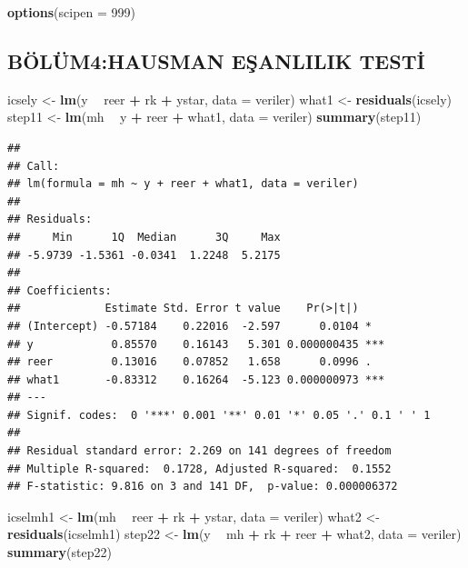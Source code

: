 \documentclass[]{article}
\newenvironment{Shaded}{\begin{snugshade}}{\end{snugshade}}
\newcommand{\KeywordTok}[1]{\textcolor[rgb]{0.13,0.29,0.53}{\textbf{#1}}}
\newcommand{\DataTypeTok}[1]{\textcolor[rgb]{0.13,0.29,0.53}{#1}}
\newcommand{\DecValTok}[1]{\textcolor[rgb]{0.00,0.00,0.81}{#1}}
\newcommand{\StringTok}[1]{\textcolor[rgb]{0.31,0.60,0.02}{#1}}
\newcommand{\OperatorTok}[1]{\textcolor[rgb]{0.81,0.36,0.00}{\textbf{#1}}}
\newcommand{\NormalTok}[1]{#1}
\begin{document}
\begin{Shaded}
\begin{Highlighting}[]
\KeywordTok{options}\NormalTok{(}\DataTypeTok{scipen =} \DecValTok{999}\NormalTok{)}
\end{Highlighting}
\end{Shaded}

\subsection{BÖLÜM4:HAUSMAN EŞANLILIK
TESTİ}\label{bolum4hausman-esanlilik-testi}

\begin{Shaded}
\begin{Highlighting}[]
\NormalTok{icsely <-}\StringTok{ }\KeywordTok{lm}\NormalTok{(y }\OperatorTok{~}\StringTok{ }\NormalTok{reer }\OperatorTok{+}\StringTok{ }\NormalTok{rk }\OperatorTok{+}\StringTok{ }\NormalTok{ystar, }\DataTypeTok{data =}\NormalTok{ veriler)}
\NormalTok{what1 <-}\StringTok{ }\KeywordTok{residuals}\NormalTok{(icsely)}
\NormalTok{step11 <-}\StringTok{ }\KeywordTok{lm}\NormalTok{(mh }\OperatorTok{~}\StringTok{ }\NormalTok{y }\OperatorTok{+}\StringTok{ }\NormalTok{reer }\OperatorTok{+}\StringTok{ }\NormalTok{what1, }\DataTypeTok{data =}\NormalTok{ veriler)}
\KeywordTok{summary}\NormalTok{(step11)}
\end{Highlighting}
\end{Shaded}

\begin{verbatim}
## 
## Call:
## lm(formula = mh ~ y + reer + what1, data = veriler)
## 
## Residuals:
##     Min      1Q  Median      3Q     Max 
## -5.9739 -1.5361 -0.0341  1.2248  5.2175 
## 
## Coefficients:
##             Estimate Std. Error t value    Pr(>|t|)    
## (Intercept) -0.57184    0.22016  -2.597      0.0104 *  
## y            0.85570    0.16143   5.301 0.000000435 ***
## reer         0.13016    0.07852   1.658      0.0996 .  
## what1       -0.83312    0.16264  -5.123 0.000000973 ***
## ---
## Signif. codes:  0 '***' 0.001 '**' 0.01 '*' 0.05 '.' 0.1 ' ' 1
## 
## Residual standard error: 2.269 on 141 degrees of freedom
## Multiple R-squared:  0.1728, Adjusted R-squared:  0.1552 
## F-statistic: 9.816 on 3 and 141 DF,  p-value: 0.000006372
\end{verbatim}

\begin{Shaded}
\begin{Highlighting}[]
\NormalTok{icselmh1 <-}\StringTok{ }\KeywordTok{lm}\NormalTok{(mh }\OperatorTok{~}\StringTok{ }\NormalTok{reer }\OperatorTok{+}\StringTok{ }\NormalTok{rk }\OperatorTok{+}\StringTok{ }\NormalTok{ystar, }\DataTypeTok{data =}\NormalTok{ veriler)}
\NormalTok{what2 <-}\StringTok{ }\KeywordTok{residuals}\NormalTok{(icselmh1)}
\NormalTok{step22 <-}\StringTok{ }\KeywordTok{lm}\NormalTok{(y }\OperatorTok{~}\StringTok{ }\NormalTok{mh }\OperatorTok{+}\StringTok{ }\NormalTok{rk }\OperatorTok{+}\StringTok{ }\NormalTok{reer }\OperatorTok{+}\StringTok{ }\NormalTok{what2, }\DataTypeTok{data =}\NormalTok{ veriler)}
\KeywordTok{summary}\NormalTok{(step22)}
\end{Highlighting}
\end{Shaded}
\end{document}
